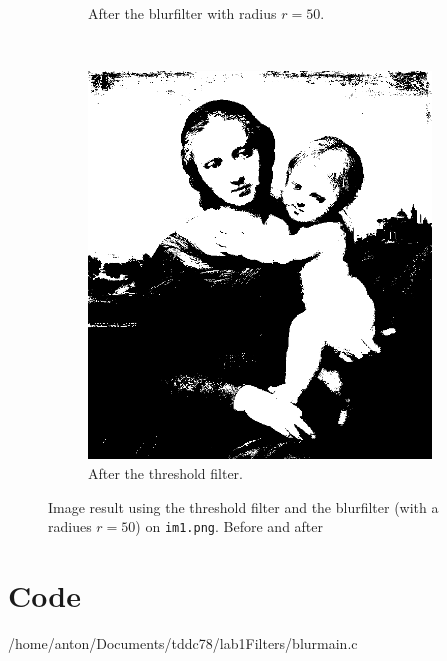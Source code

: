 \documentclass[two column]{article}
\begin{document}
\begin{figure}[h]
\begin{subfigure}{0.3\textwidth}
    \caption{After the blurfilter with radius $r = 50$.}
  \end{subfigure}
  ~%
  \begin{subfigure}{0.3\textwidth}
    \includegraphics[width=\textwidth]{test.png}
    \caption{After the threshold filter.}
  \end{subfigure}
  \caption{Image result using the threshold filter and the blurfilter
    (with a radiues $r = 50$) on 
    \texttt{im1.png}. Before and after}
  \label{fig:thres}
\end{figure}



\clearpage
\onecolumn
\section*{Code}
\label{sec:code}


{/home/anton/Documents/tddc78/lab1Filters/blurmain.c}

\clearpage


\end{document}
